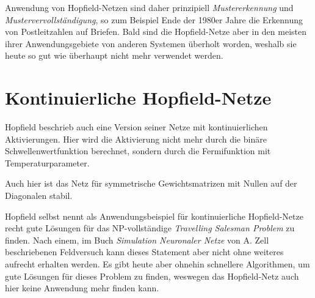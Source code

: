 Anwendung von Hopfield-Netzen sind daher prinzipiell \emph{Mustererkennung} und \emph{Mustervervollständigung}, so zum Beispiel Ende der 1980er Jahre die Erkennung von Postleitzahlen auf Briefen. Bald sind die Hopfield-Netze aber in den meisten ihrer Anwendungsgebiete von anderen Systemen überholt worden, weshalb sie heute so gut wie überhaupt nicht mehr verwendet werden.



\section*{Kontinuierliche Hopfield-Netze}
Hopfield beschrieb auch eine Version seiner Netze mit kontinuierlichen Aktivierungen. Hier wird die Aktivierung nicht mehr durch die binäre Schwellenwertfunktion berechnet, sondern durch die Fermifunktion mit Temperaturparameter.

Auch hier ist das Netz für symmetrische Gewichtsmatrizen mit Nullen auf der Diagonalen stabil.

Hopfield selbst nennt als Anwendungsbeispiel für kontinuierliche Hopfield-Netze recht gute Lösungen für das NP-vollständige \emph{Travelling Salesman Problem} zu finden.
Nach einem, im Buch \emph{Simulation Neuronaler Netze} von A. Zell beschriebenen Feldversuch kann dieses Statement aber nicht ohne weiteres aufrecht erhalten werden.
Es gibt heute aber ohnehin schnellere Algorithmen, um gute Lösungen für dieses Problem zu finden, weswegen das Hopfield-Netz auch hier keine Anwendung mehr finden kann.


